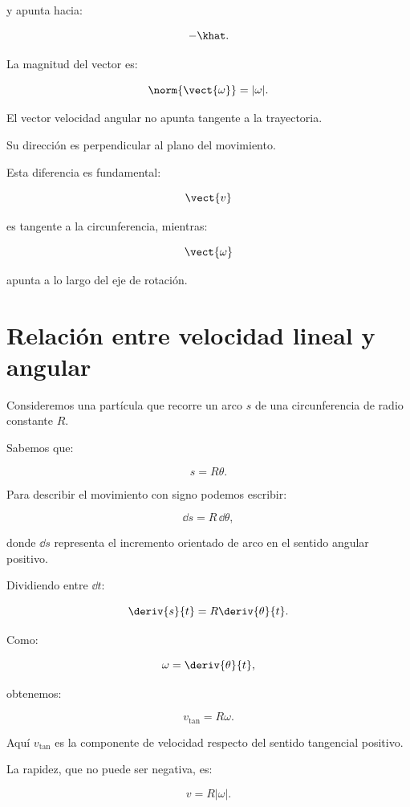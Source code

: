 y apunta hacia:

\[
-\khat.
\]

La magnitud del vector es:

\[
\norm{\vect{\omega}}=|\omega|.
\]

\begin{interpretacion}

El vector velocidad angular no apunta tangente a la trayectoria.

Su dirección es perpendicular al plano del movimiento.

Esta diferencia es fundamental:

\[
\vect{v}
\]

es tangente a la circunferencia, mientras:

\[
\vect{\omega}
\]

apunta a lo largo del eje de rotación.

\end{interpretacion}


\section{Relación entre velocidad lineal y angular}

Consideremos una partícula que recorre un arco \(s\) de una circunferencia de
radio constante \(R\).

Sabemos que:

\[
s=R\theta.
\]

Para describir el movimiento con signo podemos escribir:

\[
\dd s=R\,\dd\theta,
\]

donde \(\dd s\) representa el incremento orientado de arco en el sentido
angular positivo.

Dividiendo entre \(\dd t\):

\[
\deriv{s}{t}
=
R\deriv{\theta}{t}.
\]

Como:

\[
\omega=\deriv{\theta}{t},
\]

obtenemos:

\[
\boxed{
v_{\mathrm{tan}}=R\omega
}.
\]

Aquí \(v_{\mathrm{tan}}\) es la componente de velocidad respecto del sentido
tangencial positivo.

La rapidez, que no puede ser negativa, es:

\[
\boxed{
v=R|\omega|
}.
\]

